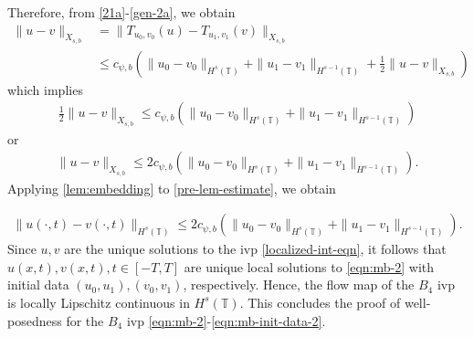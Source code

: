 \documentclass[12pt,reqno]{amsart}
\numberwithin{equation}{section}  %
\numberwithin{figure}{section}
\newcommand{\ci}{\mathbb{T}}
\theoremstyle{plain}
\theoremstyle{definition}
\theoremstyle{remark}
\begin{document}
%
%
Therefore, from \eqref{21a}-\eqref{gen-2a}, we obtain
%
%
\begin{equation*}
	\begin{split}
    \|u -v \|_{X_{s,b}}
    & = \|T_{u_0, v_0}(u) - T_{u_1, v_1}(v) \|_{X_{s,b}}
    \\
    & \le
    c_{\psi, b} \left( \|u_0 -v_0 \|_{H^s\left( \ci \right)} +\|u_1 -v_1
        \|_{H^{s-1}\left( \ci \right)} + \frac{1}{2} \|u -v \|_{X_{s,b}}\right)
  \end{split}
\end{equation*}
%
%
which implies
%
%
\begin{equation*}
	\begin{split}
		\frac{1}{2} \|u-v\|_{X_{s,b}} \le
    c_{\psi, b} \left( \|u_0 -v_0 \|_{H^s\left( \ci \right)} +\|u_1 -v_1
        \|_{H^{s-1}\left( \ci \right)} \right )
      \end{split}
\end{equation*}
%
%
or
%
%
\begin{equation}
	\begin{split}
		\|u -v \|_{X_{s,b}} \le 2 c_{\psi, b} \left( \|u_0 -v_0 \|_{H^s\left( \ci \right)} +\|u_1 -v_1
        \|_{H^{s-1}\left( \ci \right)} \right ).
	\end{split}
  \label{pre-lem-estimate}
\end{equation}
%
%
Applying  
\autoref{lem:embedding} to \eqref{pre-lem-estimate}, we obtain 

%
%
%
	 \begin{equation*}
		 \begin{split}
			\|u(\cdot, t) -v(\cdot, t) \|_{H^s(\ci)} \le
      2 c_{\psi, b} \left( \|u_0 -v_0 \|_{H^s\left( \ci \right)} +\|u_1 -v_1
        \|_{H^{s-1}\left( \ci \right)} \right ).
		 \end{split}
	 \end{equation*}
Since $u,v$ are the unique solutions to the ivp
\eqref{localized-int-eqn}, it follows that $u(x,t), v(x,t), t \in [-T, T]$ are unique
local solutions to \eqref{eqn:mb-2} with
initial data $(u_0, u_1), (v_0, v_1)$, respectively.
Hence, the flow map of the $B_4$ ivp is locally Lipschitz continuous in
$H^s(\ci)$. This
concludes the proof of well-posedness for the $B_4$ ivp
\eqref{eqn:mb-2}-\eqref{eqn:mb-init-data-2}. \qquad \qedsymbol

%
%
%
%
%
%
%
%
%
%
%
%
%
%
\end{document}
